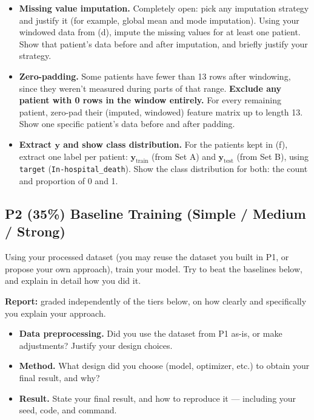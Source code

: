 \documentclass{article}
\newcommand{\bfy}{\mathbf{y}}
\begin{document}
\begin{itemize}
\item[(e) 7\%] \textbf{Missing value imputation.} Completely open: pick any imputation strategy and justify it (for example, global mean and mode imputation). Using your windowed data from (d), impute the missing values for at least one patient. Show that patient's data before and after imputation, and briefly justify your strategy.

\item[(f) 7\%] \textbf{Zero-padding.} Some patients have fewer than 13 rows after windowing, since they weren't measured during parts of that range. \textbf{Exclude any patient with 0 rows in the window entirely.} For every remaining patient, zero-pad their (imputed, windowed) feature matrix up to length 13. Show one specific patient's data before and after padding.

\item[(g) 7\%] \textbf{Extract $\bfy$ and show class distribution.} For the patients kept in (f), extract one label per patient: $\bfy_{\text{train}}$ (from Set A) and $\bfy_{\text{test}}$ (from Set B), using \texttt{target} (\texttt{In-hospital\_death}). Show the class distribution for both: the count and proportion of 0 and 1.
\end{itemize}

\subsection*{P2 (35\%) \textbf{Baseline Training (Simple / Medium / Strong)}}

Using your processed dataset (you may reuse the dataset you built in P1, or propose your own approach), train your model. Try to beat the baselines below, and explain in detail how you did it.

\textbf{Report:} graded independently of the tiers below, on how clearly and specifically you explain your approach.
\begin{itemize}
    \item[3\%] \textbf{Data preprocessing.} Did you use the dataset from P1 as-is, or make adjustments? Justify your design choices.
    \item[3\%] \textbf{Method.} What design did you choose (model, optimizer, etc.) to obtain your final result, and why?
    \item[4\%] \textbf{Result.} State your final result, and how to reproduce it --- including your seed, code, and command.
\end{itemize}
\end{document}
